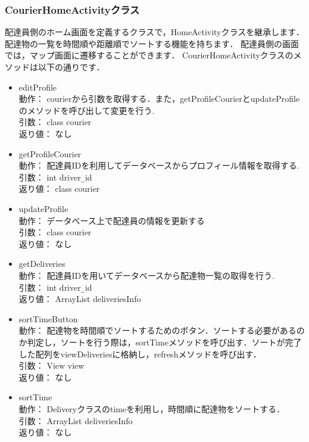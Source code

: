 \documentclass[a4j,titlepage]{jarticle}
\begin{document}
\subsubsection{CourierHomeActivityクラス}
配達員側のホーム画面を定義するクラスで，HomeActivityクラスを継承します．
配達物の一覧を時間順や距離順でソートする機能を持ちます．
配達員側の画面では，マップ画面に遷移することができます．
CourierHomeActivityクラスのメソッドは以下の通りです．
\begin{itemize}
  \item editProfile\\
  動作：  courierから引数を取得する．また，getProfileCourierとupdateProfileのメソッドを呼び出して変更を行う.\\
  引数：  class courier\\
  返り値：  なし

  \item getProfileCourier\\
  動作：  配達員IDを利用してデータベースからプロフィール情報を取得する.\\
  引数：  int driver\verb|_|id\\
  返り値：  class courier

  \item updateProfile\\
  動作：  データベース上で配達員の情報を更新する\\
  引数：  class courier\\
  返り値：  なし

  \item getDeliveries\\
  動作：  配達員IDを用いてデータベースから配達物一覧の取得を行う.\\
  引数：  int driver\verb|_|id\\
  返り値：  ArrayList deliveriesInfo

  \item sortTimeButton\\
  動作：  配達物を時間順でソートするためのボタン．ソートする必要があるのか判定し，ソートを行う際は，sortTimeメソッドを呼び出す．ソートが完了した配列をviewDeliveriesに格納し，refreshメソッドを呼び出す．\\
  引数：  View view\\
  返り値：  なし

  \item sortTime\\
  動作：  Deliveryクラスのtimeを利用し，時間順に配達物をソートする．\\
  引数：  ArrayList deliveriesInfo\\
  返り値：  なし


\end{itemize}
\end{document}
